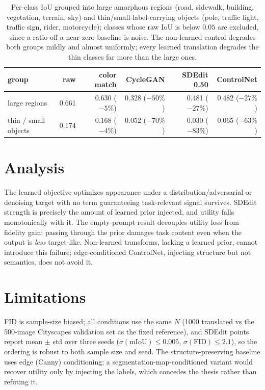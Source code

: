 \begin{table}[t]
\centering
\caption{Per-class IoU grouped into large amorphous regions (road, sidewalk, building,
vegetation, terrain, sky) and thin/small label-carrying objects (pole, traffic light, traffic
sign, rider, motorcycle); classes whose raw IoU is below $0.05$ are excluded, since a ratio off a
near-zero baseline is noise. The non-learned control degrades both groups mildly and almost
uniformly; every learned translation degrades the thin classes far more than the large ones.}
\label{tab:perclass}
\begin{tabular}{lrrrrr}
\toprule
group & raw & color match & CycleGAN & SDEdit 0.50 & ControlNet \\
\midrule
large regions        & 0.661 & 0.630 ($-5\%$)  & 0.328 ($-50\%$) & 0.481 ($-27\%$) & 0.482 ($-27\%$) \\
thin / small objects & 0.174 & 0.168 ($-4\%$)  & 0.052 ($-70\%$) & 0.030 ($-83\%$) & 0.065 ($-63\%$) \\
\bottomrule
\end{tabular}
\end{table}

\section{Analysis}
The learned objective optimizes appearance under a distribution/adversarial or
denoising target with no term guaranteeing task-relevant signal survives. SDEdit
strength is precisely the amount of learned prior injected, and utility falls
monotonically with it. The empty-prompt result decouples utility loss from fidelity
gain: passing through the prior damages task content even when the output is
\emph{less} target-like. Non-learned transforms, lacking a learned prior, cannot
introduce this failure; edge-conditioned ControlNet, injecting structure but not
semantics, does not avoid it.

\section{Limitations}
FID is sample-size biased; all conditions use the same $N$ (1000 translated vs the
500-image Cityscapes validation set as the fixed reference), and SDEdit points
report mean $\pm$ std over three seeds ($\sigma(\text{mIoU})\le0.005$,
$\sigma(\text{FID})\le2.1$), so the ordering is robust to both sample size and
seed. The structure-preserving baseline uses edge (Canny) conditioning; a
segmentation-map-conditioned variant would recover utility only by injecting the
labels, which concedes the thesis rather than refuting it.

